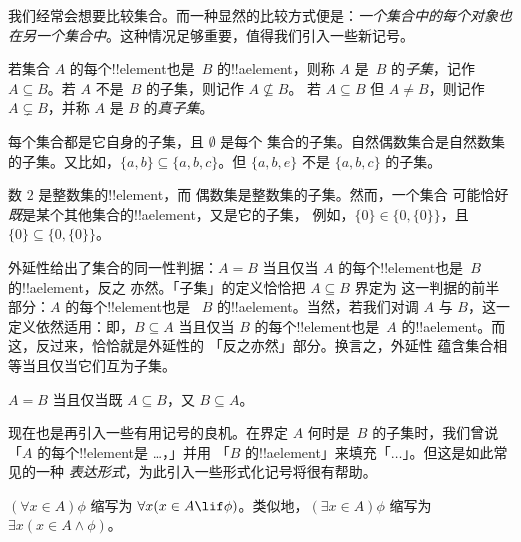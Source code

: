 \documentclass[../../../include/open-logic-section]{subfiles}
\begin{document}

\begin{explain}
我们经常会想要比较集合。而一种显然的比较方式便是：\emph{一个集合中的每个对象也在另一个集合中}。这种情况足够重要，值得我们引入一些新记号。
\end{explain}

\begin{defn}[子集]
若集合 $A$ 的每个!!{element}也是~$B$ 的!!a{element}，则称
$A$ 是~$B$ 的\emph{子集}，记作 $A \subseteq B$。若
$A$ 不是~$B$ 的子集，则记作 $A \not\subseteq B$。
若 $A \subseteq B$ 但 $A \neq B$，则记作 $A \subsetneq B$，并称
$A$ 是 $B$ 的\emph{真子集}。
\end{defn}

\begin{ex}
每个集合都是它自身的子集，且 $\emptyset$ 是每个
集合的子集。自然偶数集合是自然数集的子集。又比如，$\{ a, b \} \subseteq \{ a, b, c \}$。但 $\{ a, b, e
\}$ 不是 $\{ a, b, c \}$ 的子集。
\end{ex}

\begin{ex}
数 $2$ 是整数集的!!{element}，而
偶数集是整数集的子集。然而，一个集合
可能恰好\emph{既}是某个其他集合的!!a{element}，又是它的子集，
例如，$\{0\} \in \{0, \{0\}\}$，且 $\{0\} \subseteq \{0,
\{0\}\}$。
\end{ex}

外延性给出了集合的同一性判据：$A = B$ 当且仅当
$A$ 的每个!!{element}也是~$B$ 的!!a{element}，反之
亦然。「子集」的定义恰恰把 $A \subseteq B$ 界定为
这一判据的前半部分：$A$ 的每个!!{element}也是
~$B$ 的!!a{element}。当然，若我们对调
$A$ 与 $B$，这一定义依然适用：即，$B \subseteq A$ 当且仅当 $B$ 的每个!!{element}也是~$A$ 的!!a{element}。而这，反过来，恰恰就是外延性的
「反之亦然」部分。换言之，外延性
蕴含集合相等当且仅当它们互为子集。

\begin{prop}
$A = B$ 当且仅当既 $A \subseteq B$，又 $B \subseteq A$。
\end{prop}

现在也是再引入一些有用记号的良机。在界定 $A$ 何时是~$B$ 的子集时，我们曾说
「$A$ 的每个!!{element}是 \dots，」并用
「$B$ 的!!a{element}」来填充「$\dots$」。但这是如此常见的一种
\emph{表达形式}，为此引入一些形式化记号将很有帮助。

\begin{defn}
$(\forall x \in A)\phi$ 缩写为 $\forall x(x \in A \lif
\phi)$。类似地，$(\exists x \in A)\phi$ 缩写为 $\exists x(x
\in A \land \phi)$。
\end{defn}
\end{document}
